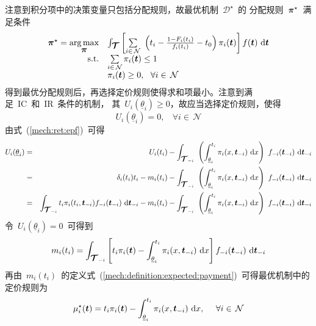 \documentclass[a4paper,12pt]{article}
\newcommand{\mv}[1]{\mbox{\boldmath$#1$}}         %
\newcommand{\id}{\mathrm{d}}                      %
\begin{document}
注意到积分项中的决策变量只包括分配规则，故最优机制~$\mathcal{D}^\star$~的
分配规则~$\mv{\pi}^\star$~满足条件
\begin{equation}\label{mech:optimal:allocation}
\begin{array}{rl}
 \mv{\pi}^\star = \mathop{\arg\max}\limits_{\mv{\pi}} & \int_{\mv{\mathcal{T}}}\left[\sum\limits_{i\in\,\mathcal{N}}~
                       \left(t_i -\frac{1 - F_i(t_i)}{f_i(t_i)} - t_0\right)\pi_i(\mv{t})\right]f(\mv{t})~\id\mv{t} \\
                       \mathrm{s.t.} & \sum\limits_{i\in\,\mathcal{N}}\pi_i(\mv{t})\le 1 \\
                        & \pi_i(\mv{t})\ge 0,~~\forall i\in\,\mathcal{N}
                     \end{array}
\end{equation}
得到最优分配规则后，再选择定价规则使得求和项最小。注意到满足~IC~和~IR~条件的机制，
其~$U_i(\underline{\theta}_i) \ge 0$，故应当选择定价规则，使得
\begin{equation*}
    U_i(\underline{\theta}_i) = 0,~~~~\forall i\in\,\mathcal{N}
\end{equation*}
由式~(\ref{mech:ret:epf})~可得
\begin{eqnarray*}
  U_i(\underline{\theta}_i) &=& U_i(t_i) - \int_{\mv{\mathcal{T}}_{-i}}~
       \left(\int_{\underline{\theta}_i}^{t_i}\pi_i(x,\mv{t}_{-i})~\id x\right)~f_{-i}(\mv{t}_{-i})~\id\mv{t}_{-i}\\
   &=& \delta_i(t_i)t_i - m_i(t_i) - \int_{\mv{\mathcal{T}}_{-i}}~
       \left(\int_{\underline{\theta}_i}^{t_i}\pi_i(x,\mv{t}_{-i})~\id x\right)~f_{-i}(\mv{t}_{-i})~\id\mv{t}_{-i}\\
   &=& \int_{\mv{\mathcal{T}}_{-i}}t_i\pi_i(t_i,\mv{t}_{-i})f_{-i}(\mv{t}_{-i})~\id\mv{t}_{-i}
        - m_i(t_i) - \int_{\mv{\mathcal{T}}_{-i}}~
       \left(\int_{\underline{\theta}_i}^{t_i}\pi_i(x,\mv{t}_{-i})~\id x\right)~f_{-i}(\mv{t}_{-i})~\id\mv{t}_{-i}\\
\end{eqnarray*}
令~$U_i(\underline{\theta}_i) = 0$~可得到
\begin{equation*}
    m_i(t_i) = \int_{\mv{\mathcal{T}}_{-i}}\left[t_i\pi_i(\mv{t})
      - \int_{\underline{\theta}_i}^{t_i}\pi_i(x,\mv{t}_{-i})~\id x\right] f_{-i}(\mv{t}_{-i})~\id\mv{t}_{-i}
\end{equation*}
再由~$m_i(t_i)$~的定义式~(\ref{mech:definition:expected:payment})~可得最优机制中的定价规则为
\begin{equation}\label{mech:optimal:payment}
    \mu_i^\star(\mv{t}) = t_i\pi_i(\mv{t}) - \int_{\underline{\theta}_i}^{t_i}\pi_i(x,\mv{t}_{-i})~\id x,
    ~~~~\forall i\in\,\mathcal{N}
\end{equation}
\end{document}
